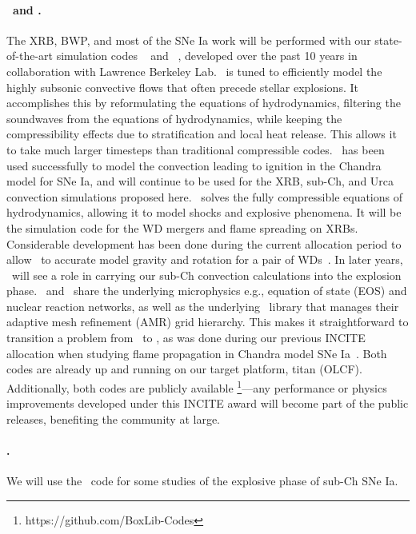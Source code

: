 \documentclass[11pt,letterpaper,english]{article}
\begin{document}
\paragraph{\maestro\ and \castro.}
%
The XRB, BWP, and most of the SNe Ia work will be performed with our
state-of-the-art simulation codes \maestro~\cite{multilevel} and
\castro~\cite{castro:I}, developed over the past 10 years in
collaboration with Lawrence Berkeley Lab.  \maestro\ is tuned to
efficiently model the highly subsonic convective flows that often
precede stellar explosions.  It accomplishes this by reformulating the
equations of hydrodynamics, filtering the soundwaves from the
equations of hydrodynamics, while keeping the compressibility effects
due to stratification and local heat release.  This allows it to take
much larger timesteps than traditional compressible codes.
\maestro\ has been used successfully to model the convection leading
to ignition in the Chandra model for SNe Ia, and will continue to be
used for the XRB, sub-Ch, and Urca convection simulations proposed
here.  \castro\ solves the fully compressible equations of
hydrodynamics, allowing it to model shocks and explosive phenomena.
It will be the simulation code for the WD mergers and flame
spreading on XRBs.  Considerable development has been done during the
current allocation period to allow \castro\ to accurate model gravity
and rotation for a pair of WDs~\cite{katz:2016}.  In later years, \castro\
will see a role in carrying our sub-Ch convection calculations into
the explosion phase.  \maestro\ and \castro\ share the underlying
microphysics e.g., equation of state (EOS) and nuclear reaction
networks, as well as the underlying \boxlib\ library that manages
their adaptive mesh refinement (AMR) grid hierarchy.  This makes it
straightforward to transition a problem from \maestro\ to \castro, as
was done during our previous INCITE allocation when studying flame
propagation in Chandra model SNe Ia~\cite{Mal14}.  Both codes are
already up and running on our target platform, titan (OLCF).
Additionally, both codes are publicly available%
\footnote{https://github.com/BoxLib-Codes}---any performance or
physics improvements developed under this INCITE award will become
part of the public releases, benefiting the community at large.

\paragraph{\flash.}
%
We will use the \flash\ code for some studies of the explosive phase
of sub-Ch SNe Ia.  \MarginPar{Tom edit}
\end{document}
